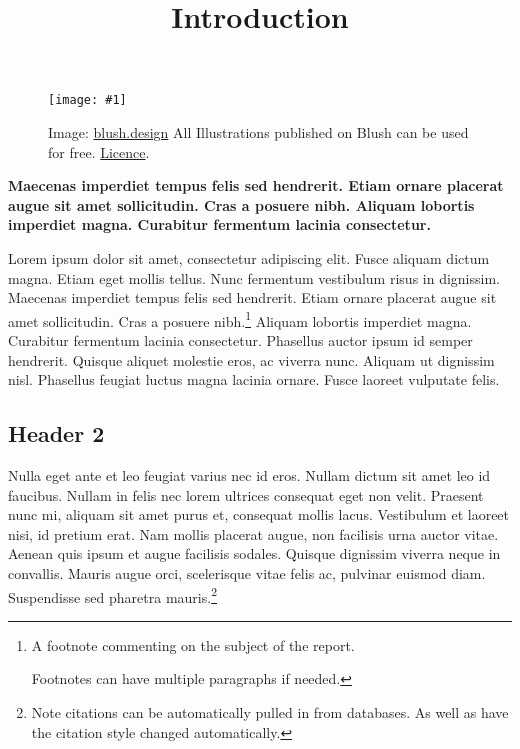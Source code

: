 \documentclass{article}
\newlength{\imgwidth}
\newcommand\scaledgraphics[2]{%
                
\settowidth{\imgwidth}{\texttt{[image: \#1]}}%
                
\setlength{\imgwidth}{\minof{\imgwidth}{#2\textwidth}}%
                
\texttt{[image: \#1]}%
                
}
\begin{document}
\title{Introduction}

\maketitle

\begin{figure}
\scaledgraphics{f717773a-5970-47da-a061-57ea8be4d822.png}{0.75}
\caption*{Image: \href{https://blush.design/}{blush.design} All Illustrations published on Blush can be used for free. \href{https://blush.design/license}{Licence}.}\label{F94100281}
\end{figure}


\textbf{Maecenas imperdiet tempus felis sed hendrerit. Etiam ornare placerat augue sit amet sollicitudin. Cras a posuere nibh. Aliquam lobortis imperdiet magna. Curabitur fermentum lacinia consectetur.}


Lorem ipsum dolor sit amet, consectetur adipiscing elit. Fusce aliquam dictum magna. Etiam eget mollis tellus. Nunc fermentum vestibulum risus in dignissim. Maecenas imperdiet tempus felis sed hendrerit. Etiam ornare placerat augue sit amet sollicitudin. Cras a posuere nibh.\footnote{A footnote commenting on the subject of the report.


Footnotes can have multiple paragraphs if needed.} Aliquam lobortis imperdiet magna. Curabitur fermentum lacinia consectetur. Phasellus auctor ipsum id semper hendrerit. Quisque aliquet molestie eros, ac viverra nunc. Aliquam ut dignissim nisl. Phasellus feugiat luctus magna lacinia ornare. Fusce laoreet vulputate felis.


\subsection{Header 2}\label{H152469}



Nulla eget ante et leo feugiat varius nec id eros. Nullam dictum sit amet leo id faucibus. Nullam in felis nec lorem ultrices consequat eget non velit. Praesent nunc mi, aliquam sit amet purus et, consequat mollis lacus. Vestibulum et laoreet nisi, id pretium erat. Nam mollis placerat augue, non facilisis urna auctor vitae. Aenean quis ipsum et augue facilisis sodales. Quisque dignissim viverra neque in convallis. Mauris augue orci, scelerisque vitae felis ac, pulvinar euismod diam. Suspendisse sed pharetra mauris.\autocite{KayAlan197208}\footnote{Note citations can be automatically pulled in from databases. As well as have the citation style changed automatically.}
\end{document}
